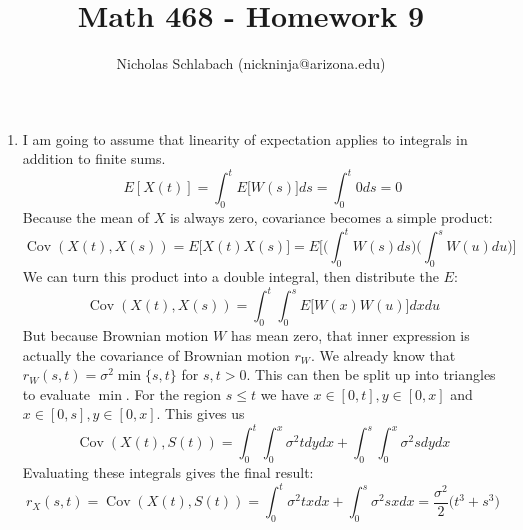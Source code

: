 \documentclass[14pt,letterpaper]{extarticle}
\title{Math 468 - Homework 9}
\author{Nicholas Schlabach (nickninja@arizona.edu)}
\date{\DTMUsedate{titledate}}
\newcommand*{\Cov}{\operatorname{Cov}}
\begin{document}
\pagestyle{fancy}
\fancyhead[C]{\hspace{5mm}\Big(\thetitle{}\Big)}
\fancyfoot{} %
\maketitle
\thispagestyle{fancy}


\begin{center}
\begin{enumerate}
\item
    I am going to assume that linearity of expectation applies to integrals in addition to finite sums.
    \[ E[X(t)]=\int_0^tE\big[W(s)\big]ds=\int_0^t0ds=0 \]
    Because the mean of $X$ is always zero, covariance becomes a simple product:  
    \[ \Cov(X(t),X(s))=E\big[X(t)X(s)\big]=E\Big[\Big(\int_0^t W(s)ds\Big)\Big(\int_0^sW(u)du\Big)\Big] \]
    We can turn this product into a double integral, then distribute the $E$:
    \[ \Cov(X(t),X(s))=\int_0^t\int_0^sE\Big[W(x)W(u)\Big]dxdu \]
    But because Brownian motion $W$ has mean zero, that inner expression is actually the covariance of Brownian motion $r_W$. We already know that $r_W(s,t)=\sigma^2\min\{s,t\}$ for $s,t>0$. This can then be split up into triangles to evaluate $\min$. For the region $s\le t$ we have $x \in [0,t], y \in [0,x]$ and $x \in [0,s], y \in [0,x]$. This gives us
    \[ \Cov(X(t),S(t))=\int_0^t\int_0^x\sigma^2 tdydx+\int_0^s\int_0^x\sigma^2 sdydx\]
    Evaluating these integrals gives the final result:
    \[ r_X(s,t)=\Cov(X(t),S(t))=\int_0^t\sigma^2txdx+\int_0^s\sigma^2sxdx=\frac{\sigma^2}{2}\Big(t^3+s^3\Big) \]
\end{enumerate}
\end{center}
\end{document}
